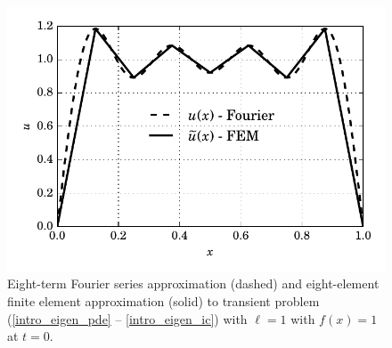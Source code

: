 \begin{figure}
  \centering
    \includegraphics[width=0.7\linewidth]{images/fenics_intro/eigen_solution.pdf}
  \caption[Comparison of FEM with Fourier series solution]{Eight-term Fourier series approximation (dashed) and eight-element finite element approximation (solid) to transient problem (\ref{intro_eigen_pde} -- \ref{intro_eigen_ic}) with $\ell = 1$ with $f(x)=1$ at $t=0$.}
  \label{1d_example_eigensolution}
\end{figure}

